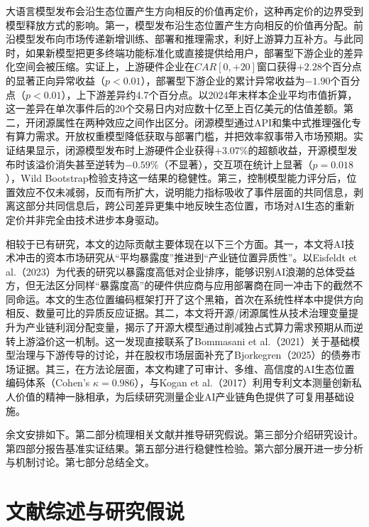 \documentclass[11pt,fontset=fandol,a4paper]{ctexart}
\newcommand{\changed}[1]{{\color{orange!85!black}#1}}
\begin{document}
\changed{大语言模型发布会沿生态位置产生方向相反的价值再定价，这种再定价的边界受到模型释放方式的影响。第一，模型发布沿生态位置产生方向相反的价值再分配。前沿模型发布向市场传递新增训练、部署和推理需求，利好上游算力互补方。与此同时，如果新模型把更多终端功能标准化或直接提供给用户，部署型下游企业的差异化空间会被压缩。实证上，上游硬件企业在$CAR[0,+20]$窗口获得$+2.28$个百分点的显著正向异常收益（$p<0.01$），部署型下游企业的累计异常收益为$-1.90$个百分点（$p<0.01$），上下游差异约4.7个百分点。以2024年末样本企业平均市值折算，这一差异在单次事件后的20个交易日内对应数十亿至上百亿美元的估值差额。第二，开闭源属性在两种效应之间作出区分。闭源模型通过API和集中式推理强化专有算力需求。开放权重模型降低获取与部署门槛，并把效率叙事带入市场预期。实证结果显示，闭源模型发布时上游硬件企业获得$+3.07\%$的超额收益，开源模型发布时该溢价消失甚至逆转为$-0.59\%$（不显著），交互项在统计上显著（$p=0.018$），Wild Bootstrap检验支持这一结果的稳健性。第三，控制模型能力评分后，位置效应不仅未减弱，反而有所扩大，说明能力指标吸收了事件层面的共同信息，剥离这部分共同信息后，跨公司差异更集中地反映生态位置，市场对AI生态的重新定价并非完全由技术进步本身驱动。}

\changed{相较于已有研究，本文的边际贡献主要体现在以下三个方面。其一，本文将AI技术冲击的资本市场研究从“平均暴露度”推进到“产业链位置异质性”。以Eisfeldt et al.（2023）为代表的研究以暴露度高低对企业排序，能够识别AI浪潮的总体受益方，但无法区分同样“暴露度高”的硬件供应商与应用部署商在同一冲击下的截然不同命运。本文的生态位置编码框架打开了这个黑箱，首次在系统性样本中提供方向相反、数量可比的异质反应证据。其二，本文将开源/闭源属性从技术治理变量提升为产业链利润分配变量，揭示了开源大模型通过削减独占式算力需求预期从而逆转上游溢价这一机制。这一发现直接联系了Bommasani et al.（2021）关于基础模型治理与下游传导的讨论，并在股权市场层面补充了Bjorkegren（2025）的债券市场证据。其三，在方法论层面，本文构建了可审计、多维、高信度的AI生态位置编码体系（Cohen's $\kappa=0.986$），与Kogan et al.（2017）利用专利文本测量创新私人价值的精神一脉相承，为后续研究测量企业AI产业链角色提供了可复用基础设施。}

\changed{余文安排如下。第二部分梳理相关文献并推导研究假说。第三部分介绍研究设计。第四部分报告基准实证结果。第五部分进行稳健性检验。第六部分展开进一步分析与机制讨论。第七部分总结全文。}


\section{文献综述与研究假说}
\end{document}
